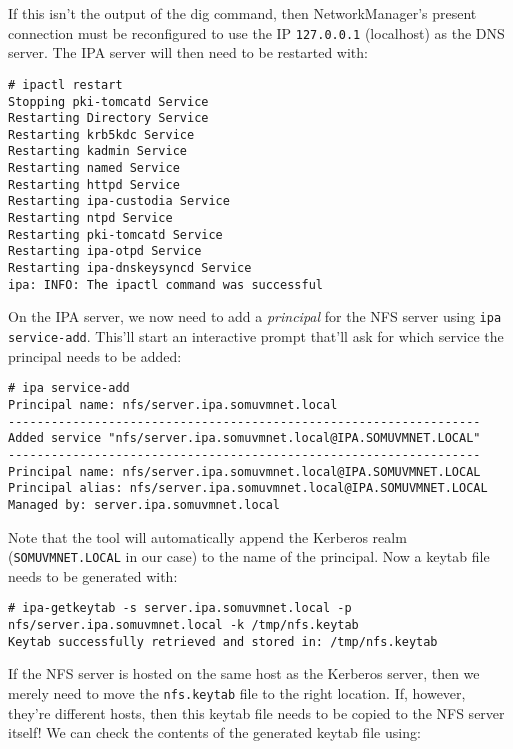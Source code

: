 \noindent
If this isn't the output of the dig command, then NetworkManager's present connection must be reconfigured to use the IP \verb|127.0.0.1| (localhost) as the DNS server. The IPA server will then need to be restarted with:

\vspace{-15pt}
\begin{verbatim}
# ipactl restart 
Stopping pki-tomcatd Service
Restarting Directory Service
Restarting krb5kdc Service
Restarting kadmin Service
Restarting named Service
Restarting httpd Service
Restarting ipa-custodia Service
Restarting ntpd Service
Restarting pki-tomcatd Service
Restarting ipa-otpd Service
Restarting ipa-dnskeysyncd Service
ipa: INFO: The ipactl command was successful
\end{verbatim}
\vspace{-10pt}	

\noindent
On the IPA server, we now need to add a \textit{principal} for the NFS server using \verb|ipa service-add|. This'll start an interactive prompt that'll ask for which service the principal needs to be added:

\vspace{-15pt}
\begin{verbatim}
# ipa service-add 
Principal name: nfs/server.ipa.somuvmnet.local
------------------------------------------------------------------
Added service "nfs/server.ipa.somuvmnet.local@IPA.SOMUVMNET.LOCAL"
------------------------------------------------------------------
Principal name: nfs/server.ipa.somuvmnet.local@IPA.SOMUVMNET.LOCAL
Principal alias: nfs/server.ipa.somuvmnet.local@IPA.SOMUVMNET.LOCAL
Managed by: server.ipa.somuvmnet.local
\end{verbatim}
\vspace{-10pt}	

\noindent
Note that the tool will automatically append the Kerberos realm (\verb|SOMUVMNET.LOCAL| in our case) to the name of the principal. Now a keytab file needs to be generated with:

\vspace{-15pt}
\begin{verbatim}
# ipa-getkeytab -s server.ipa.somuvmnet.local -p nfs/server.ipa.somuvmnet.local -k /tmp/nfs.keytab
Keytab successfully retrieved and stored in: /tmp/nfs.keytab
\end{verbatim}
\vspace{-10pt}	

\noindent
If the NFS server is hosted on the same host as the Kerberos server, then we merely need to move the \verb|nfs.keytab| file to the right location. If, however, they're different hosts, then this keytab file needs to be copied to the NFS server itself! We can check the contents of the generated keytab file using:

